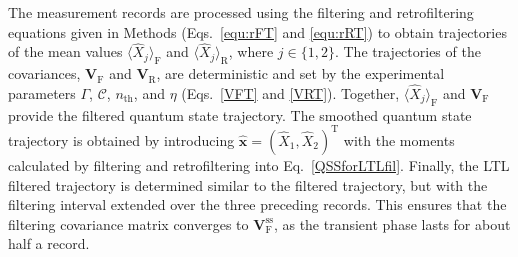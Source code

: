 \documentclass[aps,prx,twocolumn,amsmath,amssymb,superscriptaddress,floatfix,longbibliography
]{revtex4-2}
\begin{document}
The measurement records are processed using the filtering and retrofiltering equations given in Methods (Eqs.~\eqref{equ:rFT} and \eqref{equ:rRT}) to obtain trajectories of the mean values $\langle\hat{X}_j\rangle_\text{F}$ and $\langle\hat{X}_j\rangle_\text{R}$, where $j \in \{1,2\}$. The trajectories of the covariances, $\mathbf{V}_\text{F}$ and $\mathbf{V}_\text{R}$, are deterministic and set by the experimental parameters $\Gamma$, $\mathcal{C}$, $n_\text{th}$, and $\eta$ (Eqs.~\eqref{VFT} and \eqref{VRT}). Together, $\langle\hat{X}_j\rangle_\text{F}$ and $\mathbf{V}_\text{F}$ provide the filtered quantum state trajectory. The smoothed quantum state trajectory is obtained by introducing $\hat{\mathbf{x}}=(\hat{X}_1,\hat{X}_2)^\text{T}$ with the moments calculated by filtering and retrofiltering
into Eq.~\eqref{QSSforLTLfil}. Finally, the LTL filtered trajectory is determined similar to the filtered trajectory, but with the filtering interval extended over the three preceding records. This ensures that the filtering covariance matrix converges to $\mathbf{V}_\text{F}^\text{ss}$, as the transient phase lasts for about half a record.
\end{document}
